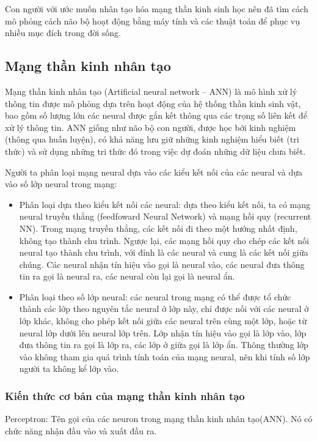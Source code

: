 Con người với ước muốn nhân tạo hóa mạng thần kinh sinh học nên đã tìm cách mô phỏng cách não bộ hoạt động bằng máy tính và các thuật toán để phục vụ nhiều mục đích trong đời sống.

\subsection{Mạng thần kinh nhân tạo}
Mạng thần kinh nhân tạo (Artificial neural network – ANN) là mô hình xử lý thông tin được mô phỏng dựa trên hoạt động của hệ thống thần kinh sinh vật, bao gồm số lượng lớn các neural được gắn kết thông qua các trọng số liên kết để xử lý thông tin. ANN giống như não bộ con người, được học bởi kinh nghiệm (thông qua huấn luyện), có khả năng lưu giữ những kinh nghiệm hiểu biết (tri thức) và sử dụng những tri thức đó trong việc dự đoán những dữ liệu chưa biết. 

Người ta phân loại mạng neural dựa vào các kiểu kết nối của các neural và dựa vào số lớp neural trong mạng:

\begin{itemize}
	\item Phân loại dựa theo kiểu kết nối các neural: dựa theo kiểu kết nối, ta có mạng neural truyền thẳng (feedfoward Neural Network) và mạng hồi quy (recurrent NN). Trong mạng truyền thẳng, các kết nối đi theo một hướng nhất định, không tạo thành chu trình. Ngược lại, các mạng hồi quy cho chép các kết nối neural tạo thành chu trình, với đỉnh là các neural và cung là các kết nối giữa chúng. Các neural nhận tín hiệu vào gọi là neural vào, các neural đưa thông tin ra gọi là neural ra, các neural còn lại gọi là neural ẩn.
	\item Phân loại theo số lớp neural: các neural trong mạng có thể được tổ chức thành các lớp theo nguyên tắc neural ở lớp này, chỉ được nối với các neural ở lớp khác, không cho phép kết nối giữa các neural trên cùng một lớp, hoặc từ neural lớp dưới lên neural lớp trên. Lớp nhận tín hiệu vào gọi là lớp vào, lớp đưa thông tin ra gọi là lớp ra, các lớp ở giữa gọi là lớp ẩn. Thông thường lớp vào không tham gia quá trình tính toán của mạng neural, nên khi tính số lớp người ta không kể lớp vào.
\end{itemize}

\subsubsection{Kiến thức cơ bản của mạng thần kinh nhân tạo}
Perceptron: Tên gọi của các neuron trong mạng thần kinh nhân tạo(ANN). Nó có chức năng nhận đầu vào và xuất đầu ra.

